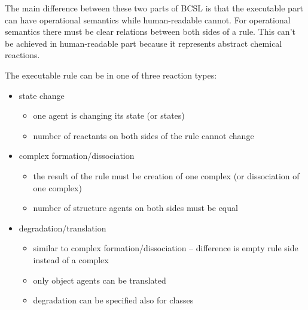 \documentclass[12pt]{article}
\begin{document}
The main difference between these two parts of BCSL is that the executable part can have operational semantics while human-readable cannot. For operational semantics there must be clear relations between both sides of a rule. This can't be achieved in human-readable part because it represents abstract chemical reactions. 

The executable rule can be in one of three reaction types:

\begin{itemize}
\item state change
	\begin{itemize}	
		\item one agent is changing its state (or states)
		\item number of reactants on both sides of the rule cannot change
	\end{itemize}
\item complex formation/dissociation 
	\begin{itemize}
		\item the result of the rule must be creation of one complex (or dissociation of one complex)
		\item number of structure agents on both sides must be equal
	\end{itemize} 
\item degradation/translation 
	\begin{itemize}
		\item similar to complex formation/dissociation -- difference is empty rule side instead of a complex
		\item only object agents can be translated
		\item degradation can be specified also for classes
	\end{itemize} 
\end{itemize}
\end{document}
